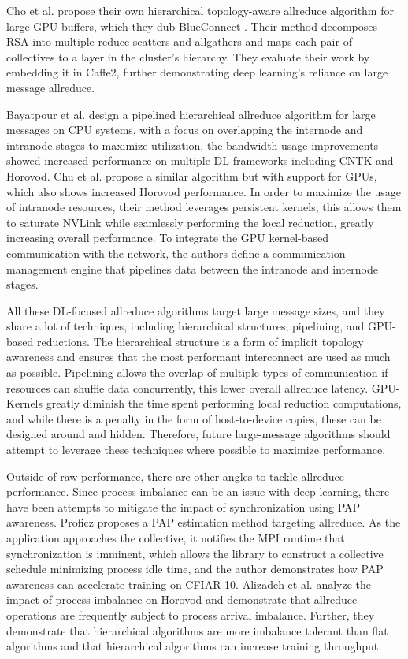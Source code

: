 Cho et al. propose their own hierarchical topology-aware allreduce algorithm for large GPU buffers, which they dub BlueConnect \cite{Cho2019BlueConnect}. 
Their method decomposes RSA into multiple reduce-scatters and allgathers and maps each pair of collectives to a layer in the cluster's hierarchy.
They evaluate their work by embedding it in Caffe2, further demonstrating deep learning's reliance on large message allreduce.

Bayatpour et al. \cite{Bayatpour2018SALaR} design a pipelined hierarchical allreduce algorithm for large messages on CPU systems, with a focus on overlapping the internode and intranode stages to maximize utilization, the bandwidth usage improvements showed increased performance on multiple DL frameworks including CNTK and Horovod. 
Chu et al. \cite{Chu2020NVGroup} propose a similar algorithm but with support for GPUs, which also shows increased Horovod performance.
In order to maximize the usage of intranode resources, their method leverages persistent kernels, this allows them to saturate NVLink while seamlessly performing the local reduction, greatly increasing overall performance. 
To integrate the GPU kernel-based communication with the network, the authors define a communication management engine that pipelines data between the intranode and internode stages.

All these DL-focused allreduce algorithms target large message sizes, and they share a lot of techniques, including hierarchical structures, pipelining, and GPU-based reductions.
The hierarchical structure is a form of implicit topology awareness and ensures that the most performant interconnect are used as much as possible.
Pipelining allows the overlap of multiple types of communication if resources can shuffle data concurrently, this lower overall allreduce latency. 
GPU-Kernels greatly diminish the time spent performing local reduction computations, and while there is a penalty in the form of host-to-device copies, these can be designed around and hidden.
Therefore, future large-message algorithms should attempt to leverage these techniques where possible to maximize performance. 

Outside of raw performance, there are other angles to tackle allreduce performance.
Since process imbalance can be an issue with deep learning, there have been attempts to mitigate the impact of synchronization using PAP awareness.
Proficz proposes a PAP estimation method \cite{Proficz2018ImprvAllReduceForImbPAP} targeting allreduce.
As the application approaches the collective, it notifies the MPI runtime that synchronization is imminent, which allows the library to construct a collective schedule minimizing process idle time, and the author demonstrates how PAP awareness can accelerate training on CFIAR-10.
Alizadeh et al. \cite{Alizadeh2022PAPCollDL} analyze the impact of process imbalance on Horovod and demonstrate that allreduce operations are frequently subject to process arrival imbalance. 
Further, they demonstrate that hierarchical algorithms are more imbalance tolerant than flat algorithms and that hierarchical algorithms can increase training throughput.

